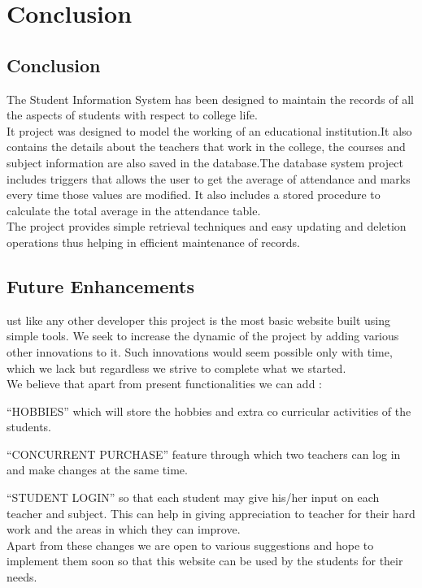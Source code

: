 \chapter{Conclusion}

\section{Conclusion}
The Student Information System has been designed to maintain the records of all the aspects of students with respect to college life.\\[0.1in] 

It project was designed  to model the working of an educational institution.It also contains the details about the teachers that work in the college, the courses and subject information are also saved in the database.The database system project includes triggers that allows the user to get the average of attendance and marks  every time those values are modified. It also includes a stored procedure to calculate the total average in the attendance table.\\[0.1in]

The project provides simple retrieval techniques and easy updating and deletion operations thus helping in efficient maintenance of records.

\pagebreak

\section{Future Enhancements}
ust like any other developer this project is the most basic website built using simple tools. We seek to increase the dynamic of the project by adding various other innovations to it. Such innovations would seem possible only with time, which we lack but regardless we strive to complete what we started.\\[0.1in]

We believe that apart from present functionalities we can add :

“HOBBIES” which will store the hobbies and extra co curricular activities of the students.

“CONCURRENT PURCHASE” feature through which two teachers can log in and make changes at the same time.


“STUDENT LOGIN” so that each student may give his/her input on each teacher and subject. This can help in giving appreciation to teacher for their hard  work and the areas in which they can improve.\\[0.1in]


Apart from these changes we are open to various suggestions and hope to implement them soon so that this website can be used by the students for their needs.





